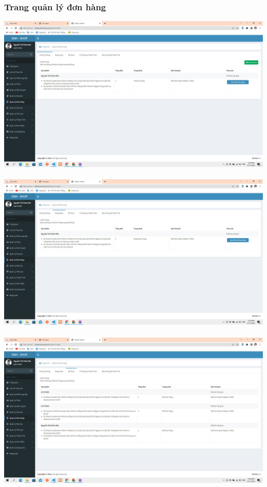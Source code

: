 \documentclass[12pt,a4paper,2sides]{report}
\begin{document}
\subsubsection{Trang quản lý đơn hàng}
    \includegraphics[width=1\linewidth]{lib/results/cholayhang.jpg}\\\vspace*{1cm}  
    \hspace{5cm}{Hình 57. Các đơn chờ lấy }\\
    \includegraphics[width=1\linewidth]{lib/results/danggiao.jpg}\\\vspace*{1cm}  
    \hspace{5cm}{Hình 58. Các đơn hàng đang giao}\\
    \includegraphics[width=1\linewidth]{lib/results/dagiao.jpg}\\\vspace*{1cm}  
\end{document}

